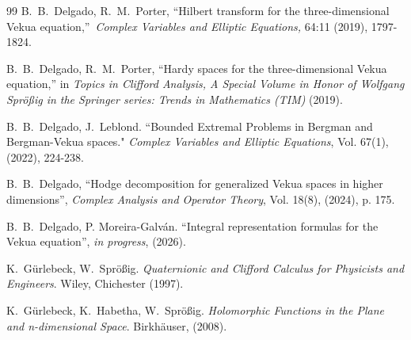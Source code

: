 \documentclass[12pt]{article}
\begin{document}
\begin{thebibliography}{99}
B.~B.~Delgado, R.~M.~Porter, \textquotedblleft Hilbert transform for the three-dimensional Vekua equation,\textquotedblright\ \emph{Complex Variables and Elliptic Equations,} 64:11 (2019), 1797-1824.


 B.~B.~Delgado, R.~M.~Porter, ``Hardy spaces for the three-dimensional Vekua equation,'' in {\em Topics in Clifford Analysis, A Special Volume in Honor of Wolfgang Spr\"{o}\ss{}ig in the Springer series: Trends in Mathematics (TIM)} (2019).
  
B.~B.~Delgado, J.~Leblond. ``Bounded Extremal Problems in Bergman and Bergman-Vekua spaces." {\em Complex Variables and Elliptic Equations}, Vol. 67(1), (2022), 224-238.

B.~B.~Delgado, ``Hodge decomposition for generalized Vekua spaces in higher dimensions'',  \emph{Complex Analysis and Operator Theory}, Vol. 18(8), (2024), p. 175.

B.~B.~Delgado, P. Moreira-Galván. ``Integral representation formulas for the Vekua equation'',  \emph{in progress}, (2026).





  

 K.~G\"{u}rlebeck, W.~Spr\"{o}\ss{}ig. {\em Quaternionic and Clifford Calculus for Physicists and Engineers}. Wiley, Chichester (1997).

K.~G\"{u}rlebeck, K.~Habetha, W.~Spr\"{o}\ss{}ig.  
{\em Holomorphic Functions in the Plane and
  n-dimensional Space}.  Birkh\"{a}user, (2008).


\end{thebibliography}
\end{document}
